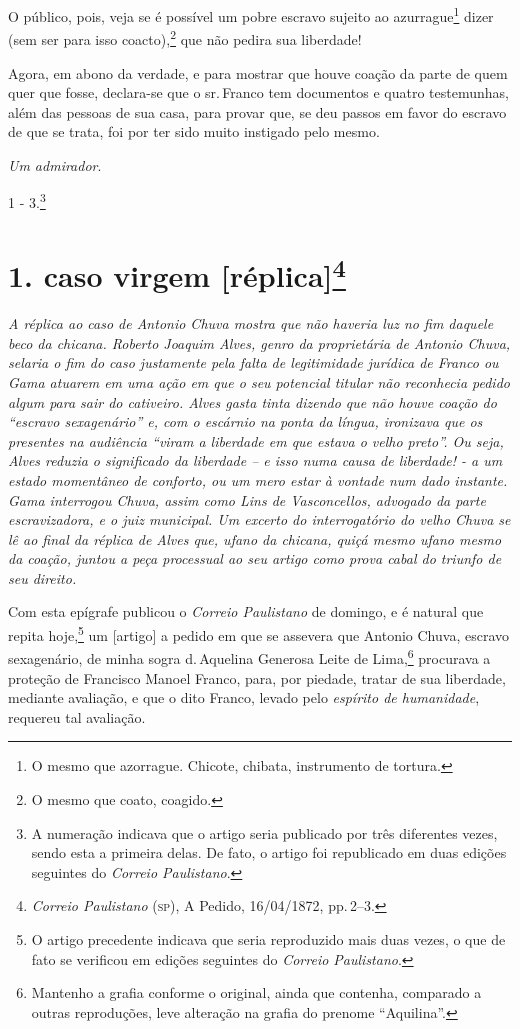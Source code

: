O público, pois, veja se é possível um pobre escravo sujeito ao
azurrague\footnote{ O mesmo que azorrague. Chicote, chibata,
  instrumento de tortura.} dizer (sem ser para isso coacto),\footnote{
  O mesmo que coato, coagido.} que não pedira sua liberdade!

Agora, em abono da verdade, e para mostrar que houve coação da parte de
quem quer que fosse, declara-se que o sr.\,Franco tem documentos e quatro
testemunhas, além das pessoas de sua casa, para provar que, se deu
passos em favor do escravo de que se trata, foi por ter sido muito
instigado pelo mesmo.

\emph{Um admirador}.

1 - 3.\footnote{ A numeração indicava que o artigo seria publicado por
  três diferentes vezes, sendo esta a primeira delas. De fato, o artigo
  foi republicado em duas edições seguintes do \emph{Correio
  Paulistano}.}

\chapter{1. caso virgem {[}réplica{]}\footnote{\emph{Correio Paulistano} (\textsc{sp}), A Pedido, 16/04/1872,
  pp.\,2--3.}} %

\begin{didascalia}
\emph{A réplica ao caso de Antonio Chuva mostra que não haveria luz no
fim daquele beco da chicana. Roberto Joaquim Alves, genro da
proprietária de Antonio Chuva, selaria o fim do caso justamente pela
falta de legitimidade jurídica de Franco ou Gama atuarem em uma ação em
que o seu potencial titular não reconhecia pedido algum para sair do
cativeiro. Alves gasta tinta dizendo que não houve coação do ``escravo
sexagenário'' e, com o escárnio na ponta da língua, ironizava que os
presentes na audiência ``viram a liberdade em que estava o velho preto''.
Ou seja, Alves reduzia o significado da liberdade -- e isso numa causa
de liberdade! - a um estado momentâneo de conforto, ou um mero estar à
vontade num dado instante. Gama interrogou Chuva, assim como Lins de
Vasconcellos, advogado da parte escravizadora, e o juiz municipal. Um
excerto do interrogatório do velho Chuva se lê ao final da réplica de
Alves que, ufano da chicana, quiçá mesmo ufano mesmo da coação, juntou a
peça processual ao seu artigo como prova cabal do triunfo de seu
direito.}
\end{didascalia}


Com esta epígrafe publicou o \emph{Correio Paulistano} de domingo, e é
natural que repita hoje,\footnote{ O artigo precedente indicava que
  seria reproduzido mais duas vezes, o que de fato se verificou em
  edições seguintes do \emph{Correio Paulistano}.} um {[}artigo{]} a
pedido em que se assevera que Antonio Chuva, escravo sexagenário, de
minha sogra d.\,Aquelina Generosa Leite de Lima,\footnote{ Mantenho a
  grafia conforme o original, ainda que contenha, comparado a outras
  reproduções, leve alteração na grafia do prenome ``Aquilina''.} procurava
a proteção de Francisco Manoel Franco, para, por piedade, tratar de sua
liberdade, mediante avaliação, e que o dito Franco, levado pelo
\emph{espírito de humanidade}, requereu tal avaliação.

